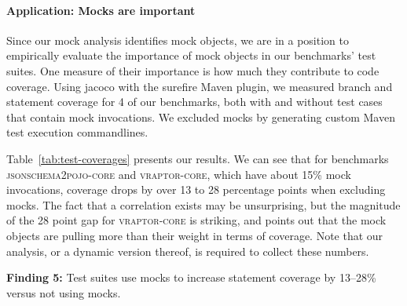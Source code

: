 \paragraph{Application: Mocks are important} Since our mock analysis identifies mock objects, we are in a position to empirically evaluate the importance of mock objects in our benchmarks' test suites. One measure of their importance is how much they contribute to code coverage. Using jacoco with the surefire Maven plugin, we measured branch and statement coverage for 4 of our benchmarks, both with and without test cases that contain mock invocations. We excluded mocks by generating custom Maven test execution commandlines. 

Table~\ref{tab:test-coverages} presents our results. We can see that for benchmarks \textsc{jsonschema2pojo-core} and \textsc{vraptor-core}, which have about 15\% mock invocations, coverage drops by over 13 to 28 percentage points when excluding mocks. The fact that a correlation exists may be unsurprising, but the magnitude of the 28 point gap for \textsc{vraptor-core} is striking, and points out that the mock objects are pulling more than their weight in terms of coverage. Note that our analysis, or a dynamic version thereof, is required to collect these numbers. 

\begin{mdframed}[
  leftmargin=\parindent,
  rightmargin=\parindent,
  skipabove=\topsep,
  skipbelow=\topsep
  ]
{\bf Finding 5:} Test suites use mocks to increase statement coverage by 13--28\% versus not using mocks.
\end{mdframed}





